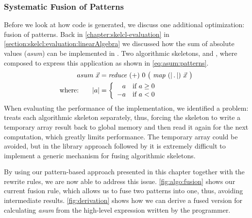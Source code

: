 \subsubsection{Systematic Fusion of Patterns}
Before we look at how \OpenCL code is generated, we discuss one additional optimization: fusion of patterns.
Back in \autoref{chapter:skelcl-evaluation} in \autoref{section:skelcl:evaluation:linearAlgebra} we discussed how the sum of absolute values (\emph{asum}) can be implemented in \SkelCL.
Two algorithmic skeletons, \reduce and \map, where composed to express this application as shown in \autoref{eq:asum:patterns}.
\begin{align}
  asum\ \vec{x} &= \reduce\ (+)\ 0\ \big(\ \map\ (|\, .\, |)\ \vec{x}\ \big)\label{eq:asum:patterns}\\
  \text{where:} \qquad | a | &=
    \left\{
      \begin{array}{r l}
      a & \text{if } a \geq 0\\
      -a & \text{if } a < 0
      \end{array}
    \right.\nonumber
\end{align}
%
When evaluating the performance of the \SkelCL implementation, we identified a problem:
\SkelCL treats each algorithmic skeleton separately, thus, forcing the \map skeleton to write a temporary array result back to global memory and then read it again for the next computation, which greatly limits performance.
The temporary array could be avoided, but in the library approach followed by \SkelCL it is extremely difficult to implement a generic mechanism for fusing algorithmic skeletons.


By using our pattern-based approach presented in this chapter together with the rewrite rules, we are now able to address this issue.
\autoref{fig:algo:fusion} shows our current fusion rule, which allows us to fuse two patterns into one, thus, avoiding intermediate results.
\autoref{fig:derivation} shows how we can derive a fused version for calculating \emph{asum} from the high-level expression written by the programmer.

